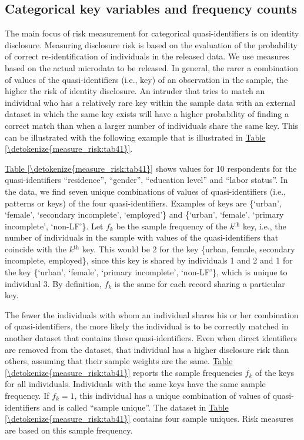 \documentclass[letterpaper,10pt,english]{sphinxmanual}
\begin{document}
\subsection{Categorical key variables and frequency counts}
\label{\detokenize{measure_risk:categorical-key-variables-and-frequency-counts}}
The main focus of risk measurement for categorical quasi-identifiers is
on identity disclosure. Measuring disclosure risk is based on the
evaluation of the probability of correct re-identification of
individuals in the released data. We use measures based on the actual
microdata to be released. In general, the rarer a combination of values
of the quasi-identifiers (i.e., key) of an observation in the sample,
the higher the risk of identity disclosure. An intruder that tries to
match an individual who has a relatively rare key within the sample data
with an external dataset in which the same key exists will have a higher
probability of finding a correct match than when a larger number of
individuals share the same key. This can be illustrated with the
following example that is illustrated in \hyperref[\detokenize{measure_risk:tab41}]{Table \ref{\detokenize{measure_risk:tab41}}}.

\hyperref[\detokenize{measure_risk:tab41}]{Table \ref{\detokenize{measure_risk:tab41}}} shows values for 10 respondents for the quasi-identifiers
“residence”, “gender”, “education level” and “labor status”. In the
data, we find seven unique combinations of values of quasi-identifiers
(i.e., patterns or keys) of the four quasi-identifiers. Examples of keys
are \{‘urban’, ‘female’, ‘secondary incomplete’, ‘employed’\} and
\{‘urban’, ‘female’, ‘primary incomplete’, ‘non-LF’\}. Let \(f_{k}\)
be the sample frequency of the \(k\)$^{\text{th}}$ key, i.e., the number of
individuals in the sample with values of the quasi-identifiers that
coincide with the \(k\)$^{\text{th}}$ key. This would be 2 for the key
\{urban, female, secondary incomplete, employed\}, since this key is
shared by individuals 1 and 2 and 1 for the key \{‘urban’, ‘female’,
‘primary incomplete’, ‘non-LF’\}, which is unique to individual 3. By
definition, \(f_{k}\) is the same for each record sharing a
particular key.

The fewer the individuals with whom an individual shares his or her
combination of quasi-identifiers, the more likely the individual is to
be correctly matched in another dataset that contains these
quasi-identifiers. Even when direct identifiers are removed from the
dataset, that individual has a higher disclosure risk than others,
assuming that their sample weights are the same. \hyperref[\detokenize{measure_risk:tab41}]{Table \ref{\detokenize{measure_risk:tab41}}} reports the
sample frequencies \(f_{k}\) of the keys for all individuals.
Individuals with the same keys have the same sample frequency. If
\(f_{k} = 1\), this individual has a unique combination of values of
quasi-identifiers and is called “sample unique”. The dataset in \hyperref[\detokenize{measure_risk:tab41}]{Table \ref{\detokenize{measure_risk:tab41}}}
contains four sample uniques. Risk measures are based on this sample
frequency.
\end{document}
